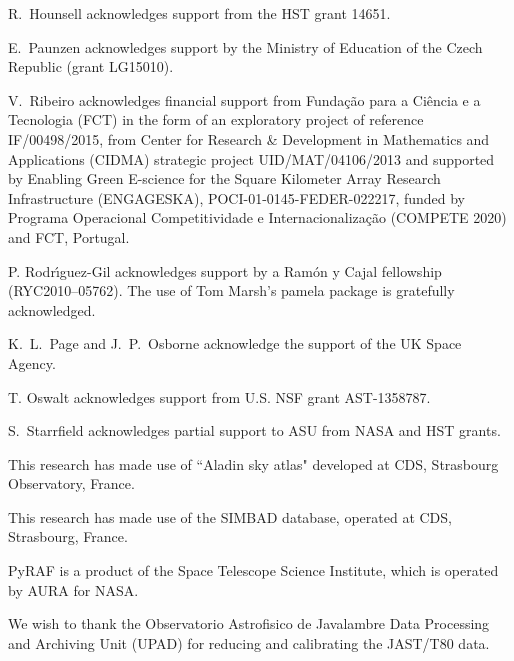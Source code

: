\documentclass[twocolumn,tighten]{aastex6}
\begin{document}
R.\ Hounsell acknowledges support from the HST grant 14651.

E.\ Paunzen acknowledges support by the Ministry of Education of the Czech Republic (grant LG15010).

V.\ Ribeiro acknowledges financial support from Funda\c{c}\~{a}o para a Ci\^encia e a Tecnologia (FCT) in the form of an exploratory project of reference IF/00498/2015, from Center for Research \& Development in Mathematics and Applications (CIDMA) strategic project UID/MAT/04106/2013 and supported by Enabling Green E-science for the Square Kilometer Array Research Infrastructure (ENGAGESKA), POCI-01-0145-FEDER-022217, funded by Programa Operacional Competitividade e Internacionaliza\c{c}\~ao (COMPETE 2020) and FCT, Portugal.

P. Rodr\'\i guez-Gil acknowledges support by a Ram\'on y Cajal fellowship (RYC2010--05762). The use of Tom Marsh's {\sc pamela} package is gratefully acknowledged.

K.~L.\ Page and J.~P.\ Osborne acknowledge the support of the UK Space Agency.

T. Oswalt acknowledges support from U.S. NSF grant AST-1358787.

S.\ Starrfield acknowledges partial support to ASU from NASA and HST grants.

This research has made use of ``Aladin sky atlas" developed at CDS, Strasbourg Observatory, France.

This research has made use of the SIMBAD database, operated at CDS, Strasbourg, France.

PyRAF is a product of the Space Telescope Science Institute, which is operated by AURA for NASA.

We wish to thank the Observatorio Astrofisico de Javalambre Data Processing and Archiving Unit (UPAD) for reducing and calibrating the JAST/T80 data.


\end{document}

